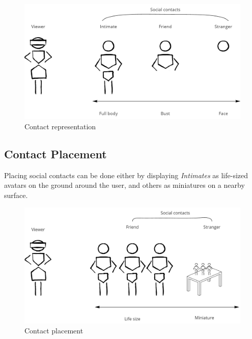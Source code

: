 \begin{figure}[h]
    \centering
    \includegraphics[width=.8\linewidth]{images/Continuum-representation.jpg}
    \caption{Contact representation}
    \label{fig:continuum:contact-representations}
\end{figure}


\subsection{Contact Placement}

Placing social contacts can be done either by displaying \textit{Intimates} as life-sized avatars on the ground around the user, and others as miniatures on a nearby surface. 

\begin{figure}[h]
    \centering
    \includegraphics[width=.8\linewidth]{images/Continuum-placement.jpg}
    \caption{Contact placement}
    \label{fig:continuum:contact-placement}
\end{figure}

